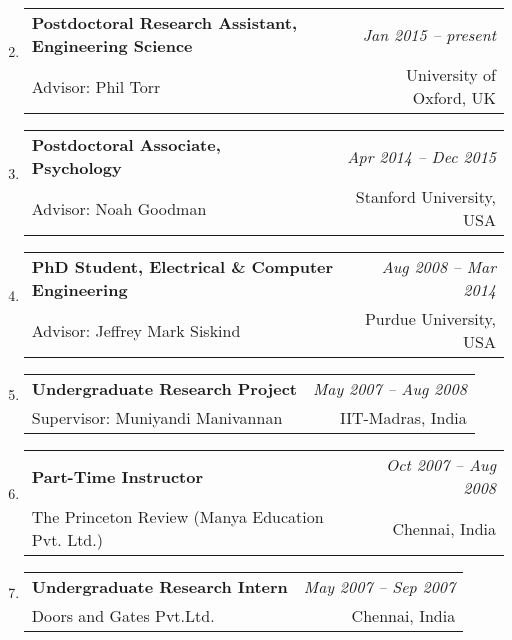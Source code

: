 \documentclass[10pt,a4paper]{article}
\makeatletter
\newcommand{\lbar}[1]{}
\newenvironment{benumerate}[2]{
    \let\oldItem\item
    \def\item{\addtocounter{enumi}{-2}\oldItem}
    \begin{enumerate}[#2]
    \setcounter{enumi}{#1}
    \addtocounter{enumi}{1}}
  {\end{enumerate}}
\newenvironment{position}[4]
{%
\item
  \begin{tabular*}{6.5in}{l@{\extracolsep{\fill}}r}
    \textbf{#1} & \textit{#2} \\ #3 & \small{#4} \\
  \end{tabular*}
  }
  { %
}
\newenvironment{region}[3]{%
  \vspace*{0.5ex}
  {\scalebox{1.4}{\textbf{#1}}}
  \begin{benumerate}{#3}{\color{RoyalBlue}#2}}
  {\end{benumerate}\vspace{1ex}}
\newenvironment{nonumregion}[1]{%
\begin{region}{#1}{}{1}}
{\end{region}}
\makeatother
\begin{document}
\begin{nonumregion} {\lbar{orange}Experience}
  \begin{position} {Postdoctoral Research Assistant, Engineering Science}
    {Jan 2015 -- present}
    {Advisor: Phil Torr}
    {University of Oxford, UK}
  \end{position}
  \begin{position} {Postdoctoral Associate, Psychology}
    {Apr 2014 -- Dec 2015}
    {Advisor: Noah Goodman}
    {Stanford University, USA}
  \end{position}
  \begin{position} {PhD Student, Electrical \& Computer Engineering}
    {Aug 2008 -- Mar 2014}
    {Advisor: Jeffrey Mark Siskind}
    {Purdue University, USA}
  \end{position}
  \begin{position} {Undergraduate Research Project}
    {May 2007 -- Aug 2008}
    {Supervisor: Muniyandi Manivannan}
    {IIT-Madras, India}
  \end{position}
  \begin{position} {Part-Time Instructor}
    {Oct 2007 -- Aug 2008}
    {The Princeton Review (Manya Education Pvt. Ltd.)}
    {Chennai, India}
  \end{position}
  \begin{position} {Undergraduate Research Intern}
    {May 2007 -- Sep 2007}
    {Doors and Gates Pvt.Ltd.}
    {Chennai, India}
  \end{position}
\end{nonumregion}

\end{document}
